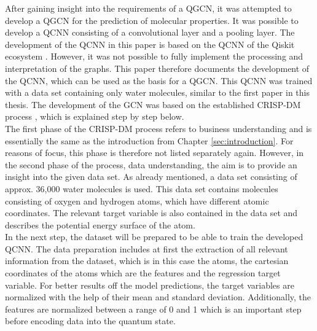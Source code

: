 After gaining insight into the requirements of a QGCN, it was attempted to develop a QGCN for the prediction of molecular properties. It was possible to develop a QCNN consisting of a convolutional layer and a pooling layer. The development of the QCNN in this paper is based on the QCNN of the Qiskit ecosystem \cite{qcnn}. However, it was not possible to fully implement the processing and interpretation of the graphs. This paper therefore documents the development of the QCNN, which can be used as the basis for a QGCN. This QCNN was trained with a data set containing only water molecules, similar to the first paper in this thesis. The development of the GCN was based on the established CRISP-DM process \cite{wirth2000crisp}, which is explained step by step below. \\

The first phase of the CRISP-DM process refers to business understanding and is essentially the same as the introduction from Chapter \ref{sec:introduction}. For reasons of focus, this phase is therefore not listed separately again. However, in the second phase of the process, data understanding, the aim is to provide an insight into the given data set. As already mentioned, a data set consisting of approx. 36,000 water molecules is used.  This data set contains molecules consisting of oxygen and hydrogen atoms, which have different atomic coordinates. The relevant target variable is also contained in the data set and describes the potential energy surface of the atom. \\

In the next step, the dataset will be prepared to be able to train the developed QCNN. The data preparation includes at first the extraction of all relevant information from the dataset, which is in this case the atoms, the cartesian coordinates of the atoms which are the features and the regression target variable. For better results off the model predictions, the target variables are normalized with the help of their mean and standard deviation. Additionally, the features are normalized between a range of 0 and 1 which is an important step before encoding data into the quantum state. \\



